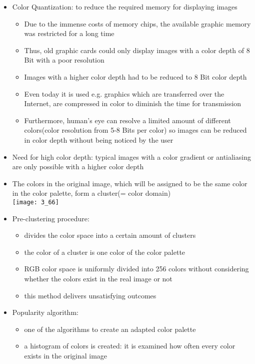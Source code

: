 \documentclass{standalone}
\begin{document}
\begin{itemize}
	\item Color Quantization: to reduce the required memory for displaying images
	\begin{itemize}
		\item Due to the immense costs of memory chips, the available graphic memory was restricted for a long time
		\item Thus, old graphic cards could only display images with a color depth of 8 Bit with a poor resolution
		\item Images with a higher color depth had to be reduced to 8 Bit color depth
		\item Even today it is used e.g. graphics which are transferred over the Internet, are compressed in color to diminish the time for transmission
		\item Furthermore, human's eye can resolve a limited amount of different colors(color resolution from 5-8 Bits per color) so images can be reduced in color depth without being noticed by the user
	\end{itemize}
	\item Need for high color depth: typical images with a color gradient or antialiasing are only possible with a higher color depth
	\item The colors in the original image, which will be assigned to be the same color in the color palette, form a cluster(= color domain) \\
	\texttt{[image: 3\_66]}
	\item Pre-clustering procedure:
	\begin{itemize}
		\item divides the color space into a certain amount of clusters
		\item the color of a cluster is one color of the color palette
		\item RGB color space is uniformly divided into 256 colors without considering whether the colors exist in the real image or not
		\item this method delivers unsatisfying outcomes
	\end{itemize}
	\item Popularity algorithm:
	\begin{itemize}
		\item one of the algorithms to create an adapted color palette
		\item a histogram of colors is created: it is examined how often every color exists in the original image \\

\end{itemize}
\end{itemize}
\end{document}
